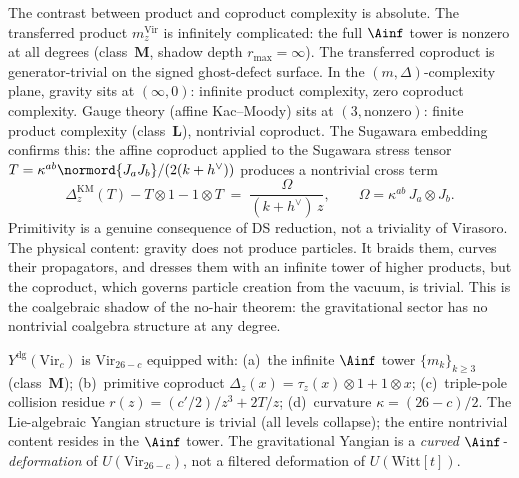 \begin{remark}
\label{rem:m-delta-complexity}
The contrast between product and coproduct complexity is absolute.
The transferred product $m_z^{\mathrm{Vir}}$ is infinitely
complicated: the full $\Ainf$ tower is nonzero at all degrees
(class~$\mathbf{M}$, shadow depth $r_{\max} = \infty$).
The transferred coproduct is generator-trivial on the signed
ghost-defect surface. In the
$(m,\Delta)$-complexity plane, gravity sits at $(\infty, 0)$:
infinite product complexity, zero coproduct complexity.
Gauge theory (affine Kac--Moody) sits at
$(3, \text{nonzero})$: finite product complexity (class~$\mathbf{L}$),
nontrivial coproduct. The Sugawara embedding confirms this:
the affine coproduct applied to the Sugawara stress tensor
$T = \kappa^{ab}\normord{J_a J_b}/(2(k + h^\vee))$ produces a
nontrivial cross term
\begin{equation}\label{eq:sugawara-coproduct-cross}
\Delta_z^{\mathrm{KM}}(T) - T \otimes 1 - 1 \otimes T
\;=\;
\frac{\Omega}{(k + h^\vee)\, z},
\qquad
\Omega = \kappa^{ab}\, J_a \otimes J_b.
\end{equation}
Primitivity is a genuine consequence of DS reduction, not a
triviality of Virasoro. The physical content: gravity does not
produce particles. It braids them, curves their propagators, and
dresses them with an infinite tower of higher products, but the
coproduct, which governs particle creation from the vacuum, is
trivial. This is the coalgebraic shadow of the no-hair theorem:
the gravitational sector has no nontrivial coalgebra structure at
any degree.
\end{remark}

\begin{remark}
\label{rem:grav-yangian-summary}
$Y^{\mathrm{dg}}(\mathrm{Vir}_c)$ is $\mathrm{Vir}_{26-c}$ equipped
with:
\textup{(a)}~the infinite $\Ainf$ tower $\{m_k\}_{k \ge 3}$
\textup{(}class~$\mathbf{M}$\textup{)};
\textup{(b)}~primitive coproduct
$\Delta_z(x) = \tau_z(x) \otimes 1 + 1 \otimes x$;
\textup{(c)}~triple-pole collision residue
$r(z) = (c'/2)/z^3 + 2T/z$;
\textup{(d)}~curvature $\kappa = (26-c)/2$.
The Lie-algebraic Yangian structure is trivial (all levels collapse);
the entire nontrivial content resides in the $\Ainf$ tower. The
gravitational Yangian is a \emph{curved $\Ainf$-deformation}
of $U(\mathrm{Vir}_{26-c})$, not a filtered deformation of
$U(\mathrm{Witt}[t])$.
\end{remark}



